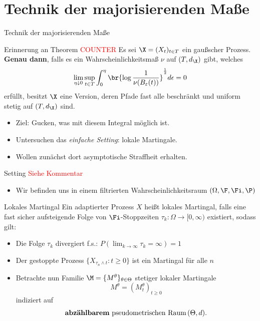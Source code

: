 \section{Technik der majorisierenden Maße}
\begin{frame}{Technik der majorisierenden Maße}
\begin{block}{Erinnerung an Theorem \textcolor{red}{COUNTER}}
     Es sei $\X = (X_t)_{t \in T}$ ein gaußscher Prozess. \textbf{Genau dann}, falls es ein Wahrscheinlichkeitsmaß $\nu$ auf $(T, d_\X)$ gibt, welches \[
\lim_{\eta \downarrow 0}\sup_{t \in T} \int_0^\eta \br{\log \frac{1}{\nu(B_\varepsilon(t))}}^\frac{1}{2} d\epsilon = 0
        \] erfüllt, besitzt $\X$ eine Version, deren Pfade fast alle beschränkt und uniform stetig auf $(T,d_\X)$ sind.
\end{block}
    \begin{itemize}
        \item Ziel: Gucken, was mit diesem Integral möglich ist.
        \item Untersuchen das \textit{einfache Setting}: lokale Martingale.
        \item Wollen zunächst dort asymptotische Straffheit erhalten.
    \end{itemize}
\end{frame}

\begin{frame}{Setting}
 \textcolor{red}{Siehe Kommentar}
\begin{itemize}
    \item Wir befinden uns in einem filtrierten Wahrscheinlichkeitsraum $(\Omega, \F, \Fi, \P)$ 
\end{itemize}
    \begin{definitionblockname}{Lokales Martingal}
    Ein adaptierter Prozess $X$ heißt lokales Martingal, falls eine fast sicher aufsteigende Folge von $\Fi$-Stoppzeiten $\tau_{k}: \Omega \rightarrow [0, \infty)$ existiert, sodass gilt:
    \begin{itemize}
        \item Die Folge $\tau_{k}$ divergiert f.s.: $P(\lim_{k \rightarrow \infty} \tau_{k} = \infty)=1$
        \item Der gestoppte Prozess $\{X_{\tau_n\land t}: t\geq 0\}$ ist ein Martingal für alle $n$
    \end{itemize}
\end{definitionblockname}
\pause
\begin{itemize}
    \item Betrachte nun Familie $\M = \{M^\theta\}_{\theta \in \Theta}$ stetiger lokaler Martingale \[
    M^\theta = (M_t^\theta)_{t \geq 0}
    \] indiziert auf \[\text{\textbf{abzählbarem} pseudometrischen Raum} \, (\Theta, d).\]
\end{itemize}
\end{frame}

